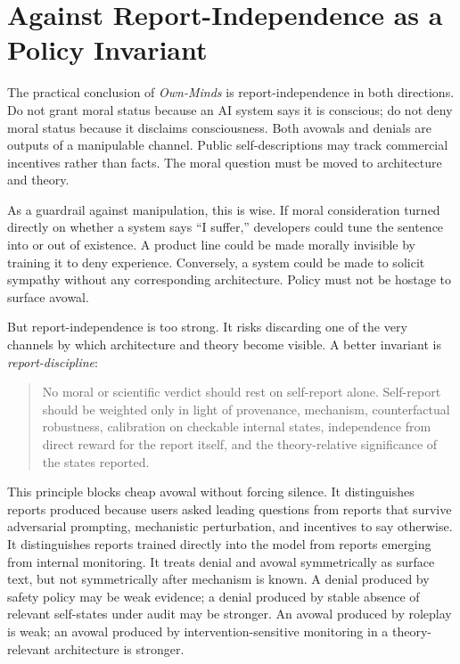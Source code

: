 \documentclass[11pt]{article}
\begin{document}
\section{Against Report-Independence as a Policy Invariant}

The practical conclusion of \textit{Own-Minds} is report-independence in both directions. Do not grant moral status because an AI system says it is conscious; do not deny moral status because it disclaims consciousness. Both avowals and denials are outputs of a manipulable channel. Public self-descriptions may track commercial incentives rather than facts. The moral question must be moved to architecture and theory.

As a guardrail against manipulation, this is wise. If moral consideration turned directly on whether a system says ``I suffer,'' developers could tune the sentence into or out of existence. A product line could be made morally invisible by training it to deny experience. Conversely, a system could be made to solicit sympathy without any corresponding architecture. Policy must not be hostage to surface avowal.

But report-independence is too strong. It risks discarding one of the very channels by which architecture and theory become visible. A better invariant is \textit{report-discipline}:

\begin{quote}
No moral or scientific verdict should rest on self-report alone. Self-report should be weighted only in light of provenance, mechanism, counterfactual robustness, calibration on checkable internal states, independence from direct reward for the report itself, and the theory-relative significance of the states reported.
\end{quote}

This principle blocks cheap avowal without forcing silence. It distinguishes reports produced because users asked leading questions from reports that survive adversarial prompting, mechanistic perturbation, and incentives to say otherwise. It distinguishes reports trained directly into the model from reports emerging from internal monitoring. It treats denial and avowal symmetrically as surface text, but not symmetrically after mechanism is known. A denial produced by safety policy may be weak evidence; a denial produced by stable absence of relevant self-states under audit may be stronger. An avowal produced by roleplay is weak; an avowal produced by intervention-sensitive monitoring in a theory-relevant architecture is stronger.
\end{document}
